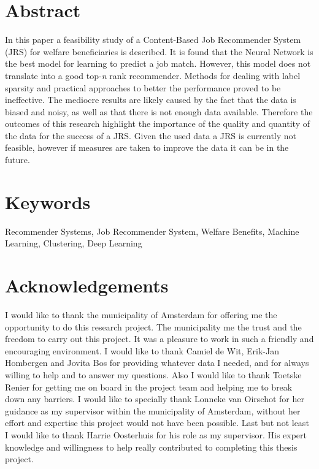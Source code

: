 \documentclass[10pt, sigconf, format=acmsmall, screen=true, review=false]{acmart}
\begin{document}
%

\pagebreak


\pagebreak
\footnotesize


\twocolumn

\section*{Abstract}
In this paper a feasibility study of a Content-Based Job Recommender System (JRS) for welfare beneficiaries is described.
It is found that the Neural Network is the best model for learning to predict a job match. 
However, this model does not translate into a good top-\textit{n} rank recommender. 
Methods for dealing with label sparsity and practical approaches to better the performance proved to be ineffective. 
The mediocre results are likely caused by the fact that the data is biased and noisy, as well as that there is not enough data available.
Therefore the outcomes of this research highlight the importance of the quality and quantity of the data for the success of a JRS.
Given the used data a JRS is currently not feasible, however if measures are taken to improve the data it can be in the future.

\section*{Keywords}
Recommender Systems, Job Recommender System, Welfare Benefits, Machine Learning, Clustering, Deep Learning










\section*{Acknowledgements}
I would like to thank the municipality of Amsterdam for offering me the opportunity to do this research project. 
The municipality me the trust and the freedom to carry out this project.
It was a pleasure to work in such a friendly and encouraging environment.
I would like to thank Camiel de Wit, Erik-Jan Hombergen and Jovita Bos for providing whatever data I needed, and for always willing to help and to answer my questions. 
Also I would like to thank Toetske Renier for getting me on board in the project team and helping me to break down any barriers. 
I would like to specially thank Lonneke van Oirschot for her guidance as my supervisor within the municipality of Amsterdam, without her effort and expertise this project would not have been possible. 
Last but not least I would like to thank Harrie Oosterhuis for his role as my supervisor. 
His expert knowledge and willingness to help really contributed to completing this thesis project.
\end{document}
